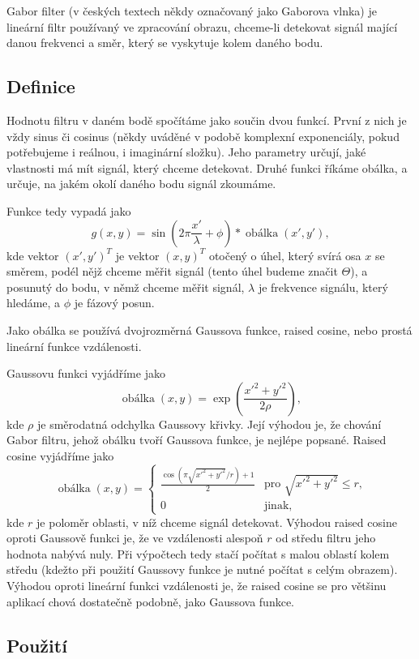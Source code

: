 Gabor filter (v českých textech někdy označovaný jako Gaborova vlnka) je
lineární filtr používaný ve zpracování obrazu, chceme-li detekovat signál
mající danou frekvenci a směr, který se vyskytuje kolem daného bodu.

\subsection{Definice}

Hodnotu filtru v daném bodě spočítáme jako součin dvou funkcí. První z nich je
vždy sinus či cosinus (někdy uváděné v podobě komplexní exponenciály, pokud
potřebujeme i reálnou, i imaginární složku). Jeho parametry určují, jaké
vlastnosti má mít signál, který chceme detekovat. Druhé funkci říkáme obálka, a
určuje, na jakém okolí daného bodu signál zkoumáme.

Funkce tedy vypadá jako $$g(x,y) =
\sin\left(2\pi\frac{x'}{\lambda}+\phi\right)*\operatorname{obálka}(x',y'),$$
kde vektor $(x',y')^T$ je vektor $(x,y)^T$ otočený o úhel, který svírá osa $x$
se směrem, podél nějž chceme měřit signál (tento úhel budeme značit $\Theta$),
a posunutý do bodu, v němž chceme měřit signál, $\lambda$ je frekvence signálu,
který hledáme, a $\phi$ je fázový posun.

Jako obálka se používá dvojrozměrná Gaussova funkce, raised cosine, nebo prostá lineární funkce vzdálenosti. 

Gaussovu funkci vyjádříme jako $$ \operatorname{obálka}(x,y) =  \exp\left(\frac{x'^2 +
y'^2}{2\rho}\right),$$ kde $\rho$ je směrodatná odchylka Gaussovy křivky. Její výhodou je, že chování Gabor filtru, jehož obálku tvoří Gaussova funkce, je nejlépe popsané. Raised cosine vyjádříme jako 
$$
\operatorname{obálka}(x,y)=
\begin{cases}
 \frac{\cos(\pi\sqrt{x'^2+y'^2}/r)+1}2 &\text{pro $\sqrt{x'^2+y'^2}\leq r$,}\\[1ex]
 0 &\text{jinak,}
\end{cases}
$$ kde $r$ je poloměr oblasti, v níž chceme signál detekovat. Výhodou raised cosine oproti Gaussově funkci je, že ve vzdálenosti alespoň $r$ od středu filtru jeho hodnota nabývá nuly. Při výpočtech tedy stačí počítat s malou oblastí kolem středu (kdežto při použití Gaussovy funkce je nutné počítat s celým obrazem). Výhodou oproti lineární funkci vzdálenosti je, že raised cosine se pro většinu aplikací chová dostatečně podobně, jako Gaussova funkce.

\subsection{Použití}


